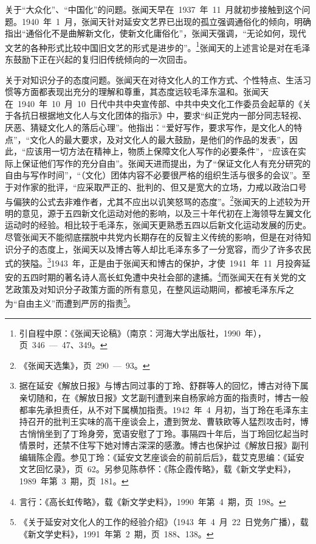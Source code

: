 关于“大众化”、“中国化”的问题。张闻天早在~1937~年~11~月就初步接触到这个问题。1940~年~1~月，张闻天针对延安文艺界已出现的孤立强调通俗化的倾向，明确指出“通俗化不是曲解新文化，使新文化庸俗化”，张闻天强调，“无论如何，现代文艺的各种形式比较中国旧文艺的形式是进步的”。\footnote{引自程中原：《张闻天论稿》（南京：河海大学出版社，1990~年），页~346~—~47、349。}张闻天的上述言论是对在毛泽东鼓励下正在兴起的复归旧传统倾向的一次回击。

关于对知识分子的态度问题。张闻天在对待文化人的工作方式、个性特点、生活习惯等方面都表现出充分的理解和尊重，其态度远较毛泽东温和。张闻天在~1940~年~10~月~10~日代中共中央宣传部、中共中央文化工作委员会起草的《关于各抗日根据地文化人与文化团体的指示》中，要求“纠正党内一部分同志轻视、厌恶、猜疑文化人的落后心理”。他指出：“爱好写作，要求写作，是文化人的特点”，“文化人的最大要求，及对文化人的最大鼓励，是他们的作品的发表”，因此，“应该用一切方法在精神上，物质上保障文化人写作的必要条件”，“应该在实际上保证他们写作的充分自由”。张闻天进而提出，为了“保证文化人有充分研究的自由与写作时间”，“（文化）团体内容不必要很严格的组织生活与很多的会议”。至于对作家的批评，“应采取严正的、批判的、但又是宽大的立场，力戒以政治口号与偏狭的公式去非难作者，尤其不应出以讥笑怒骂的态度”。\footnote{《张闻天选集》，页~290~—~93。}张闻天的上述较为开明的意见，源于五四新文化运动对他的影响，以及三十年代初在上海领导左翼文化运动时的经验。相比较于毛泽东，张闻天更熟悉五四以后新文化运动发展的历史。尽管张闻天不能彻底摆脱中共党内长期存在的反智主义传统的影响，但是在对待知识分子的态度上，张闻天以及博古等人却比毛泽东多了一分宽容，而少了许多农民式的狭隘。\footnote{据在延安《解放日报》与博古同过事的丁玲、舒群等人的回忆，博古对待下属亲切随和，在《解放日报》文艺副刊遭到来自杨家岭方面的指责时，博古一般都率先承担责任，从不对下属横加指责。1942~年~4~月初，当丁玲在毛泽东主持召开的批判王实味的高干座谈会上，遭到贺龙、曹轶欧等人猛烈攻击时，博古悄悄坐到了丁玲身旁，宽语安慰了丁玲。事隔四十年后，当丁玲回忆起当时情景时，还禁不住写下她对博古深深的感激。博古也保护过《解放日报》副刊编辑陈企霞。参见丁玲：《延安文艺座谈会的前前后后》，载艾克思编：《延安文艺回忆录》，页~62。另参见陈恭怀：《陈企霞传略》，载《新文学史料》，1989~年第~3~期，页~181。}1943~年，正是由于张闻天和博古的保护，才使~1941~年~11~月投奔延安的五四时期的著名诗人高长虹免遭中央社会部的逮捕。\footnote{言行：《高长虹传略》，载《新文学史料》，1990~年第~4~期，页~198。}而张闻天在有关党的文艺政策及对知识分子政策方面的所有意见，在整风运动期间，都被毛泽东斥之为“自由主义”而遭到严厉的指责\footnote{《关于延安对文化人的工作的经验介绍》（1943~年~4~月~22~日党务广播），载《新文学史料》，1991~年第~2~期，页~188、138。}。


